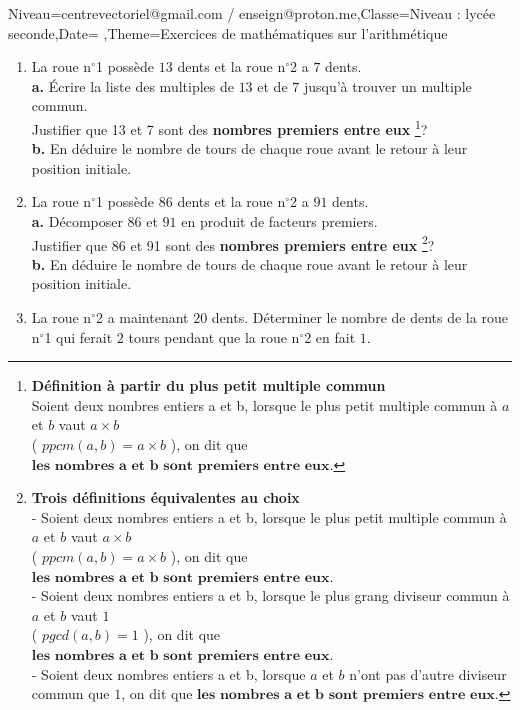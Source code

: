 \documentclass[a4paper,11pt,fleqn]{article}
\begin{document}
\begin{Maquette}[Fiche]{Niveau=centrevectoriel@gmail.com / enseign@proton.me,Classe=Niveau :  lycée seconde,Date=   ,Theme=Exercices de mathématiques  sur l'arithmétique }
\begin{exercice}
\begin{enumerate}[itemsep=2em]
	\item La roue n$^\circ$1 possède $13$ dents et la roue n$^\circ$2 a $7$ dents.\\\textbf {a.}  Écrire la liste des multiples de $13$ et de $7$ jusqu'à trouver un multiple commun.\\Justifier que 13 et 7 sont des \textbf{nombres premiers entre eux} \footnote{\textbf{Définition à partir du plus petit multiple commun} \\ Soient deux nombres entiers a et b, lorsque le plus petit multiple commun à $a$ et $b$ vaut $a \times b$ \\( $ppcm(a,b)=a\times b$ ), on dit que $\textbf{les nombres a et b sont premiers entre eux}$.}?\\\textbf {b.}  En déduire le nombre de tours de chaque roue avant le retour à leur position initiale.
	\item La roue n$^\circ$1 possède $86$ dents et la roue n$^\circ$2 a $91$ dents.\\\textbf {a.}  Décomposer $86$ et $91$ en produit de facteurs premiers.\\Justifier que 86 et 91 sont des \textbf{nombres premiers entre eux} \footnote{\textbf{Trois définitions équivalentes au choix} \\- Soient deux nombres entiers a et b, lorsque le plus petit multiple commun à $a$ et $b$ vaut $a \times b$ \\( $ppcm(a,b)=a\times b$ ), on dit que $\textbf{les nombres a et b sont premiers entre eux}$. \\-  Soient deux nombres entiers a et b, lorsque le plus grang diviseur commun à $a$ et $b$ vaut $1$ \\ ( $pgcd(a,b)=1$ ), on dit que $\textbf{les nombres a et b sont premiers entre eux}$. \\-  Soient deux nombres entiers a et b, lorsque $a$ et $b$ n'ont pas d'autre diviseur commun que $1$, on dit que $\textbf{les nombres a et b sont premiers entre eux}$.}?\\\textbf {b.}  En déduire le nombre de tours de chaque roue avant le retour à leur position initiale.
	\item La roue n$^\circ$2 a maintenant $20$ dents. Déterminer le nombre de dents de la roue n$^\circ$1 qui ferait $2$  tours  pendant que la roue n$^\circ$2 en fait $1$.

\end{enumerate}
\end{exercice}
\end{Maquette}
\end{document}
